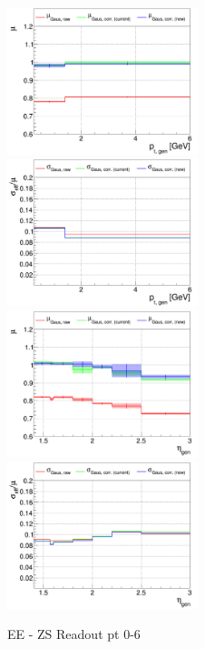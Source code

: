 \begin{figure}
\includegraphics[width=0.495\textwidth]{./plots_pdf/ECAL_plots/plotsNoPU/EE/pdf/ZS/GENPT/EEZS_GENPT_0000_0006_MuOverBins.pdf}
\includegraphics[width=0.495\textwidth]{./plots_pdf/ECAL_plots/plotsNoPU/EE/pdf/ZS/GENPT/EEZS_GENPT_0000_0006_EffSigmaOverBins.pdf}
\includegraphics[width=0.495\textwidth]{./plots_pdf/ECAL_plots/plotsNoPU/EE/pdf/ZS/GENETA/EEZS_GENETA_0000_0006_MuOverBins.pdf}
\includegraphics[width=0.495\textwidth]{./plots_pdf/ECAL_plots/plotsNoPU/EE/pdf/ZS/GENETA/EEZS_GENETA_0000_0006_EffSigmaOverBins.pdf}
\caption{EE - ZS Readout pt 0-6}
\end{figure}


